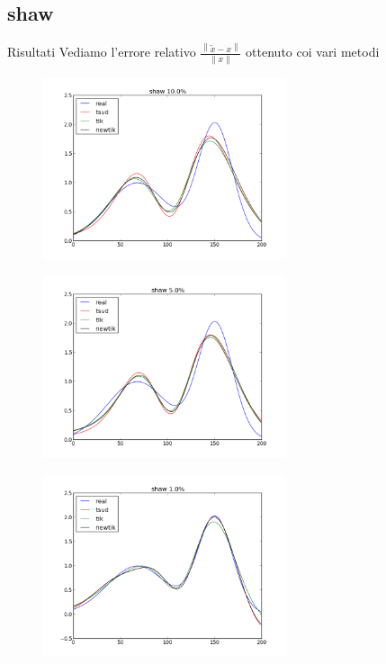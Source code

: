 \documentclass{beamer}
\theoremstyle{plain}
\theoremstyle{definition}
\theoremstyle{remark}
\newcommand{\norm}[1]{\left\|#1\right\|}
\begin{document}
\subsection{shaw}

\begin{frame}{Risultati}
  Vediamo l'errore relativo $\frac{\norm{\tilde x - x}}{\norm{x}}$
  ottenuto coi vari metodi
  \begin{center}
    
  \end{center}
\end{frame}

\begin{frame}
  \begin{figure}
    \centering
    \includegraphics[keepaspectratio,width=270px]{shaw_100.png}
  \end{figure}
\end{frame}

\begin{frame}
  \begin{figure}
    \centering
    \includegraphics[keepaspectratio,width=270px]{shaw_50.png}
  \end{figure}
\end{frame}

\begin{frame}
  \begin{figure}
    \centering
    \includegraphics[keepaspectratio,width=270px]{shaw_10.png}
  \end{figure}
\end{frame}
\end{document}
